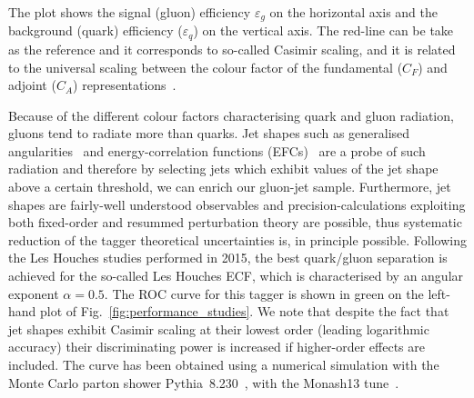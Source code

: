 %
The plot shows the signal (gluon) efficiency $\varepsilon_g$ on the horizontal axis and the background (quark) efficiency ($\varepsilon_q$) on the vertical axis. The red-line can be take as the reference and it corresponds to so-called Casimir scaling, and it is related to the universal scaling between the colour factor of the fundamental ($C_F$) and adjoint ($C_A$) representations~\cite{Larkoski:2014pca}. 

Because of the different colour factors characterising quark and gluon radiation, gluons tend to radiate more than quarks. Jet shapes such as generalised angularities~\cite{Larkoski:2014pca} and energy-correlation functions (EFCs)~\cite{Larkoski:2013eya} are a probe of such radiation and therefore by selecting jets which exhibit values of the jet shape above a certain threshold, we can enrich our gluon-jet sample. 
% 
Furthermore, jet shapes are fairly-well understood observables and precision-calculations exploiting both fixed-order and resummed perturbation theory are possible, thus systematic reduction of the tagger theoretical uncertainties is, in principle possible. Following the Les Houches studies performed in 2015, the best quark/gluon separation is achieved for the so-called Les Houches ECF, which is characterised by an angular exponent $\alpha=0.5$.
%
The ROC curve for this tagger is shown in green on the left-hand plot of  Fig.~\ref{fig:performance_studies}. We note that despite the fact that jet shapes exhibit Casimir scaling at their lowest order (leading logarithmic accuracy) their discriminating power is increased if higher-order effects are included.
%
The curve has been obtained using a numerical simulation with the Monte Carlo parton shower Pythia~8.230~\cite{Sjostrand:2014zea}, with the Monash13 tune~\cite{Skands:2014pea}.


